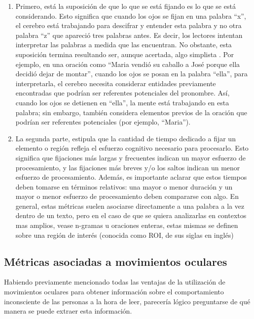 \begin{enumerate}
    \item Primero, está la suposición de que lo que se está fijando es lo que se está considerando. Esto significa que cuando los ojos se fijan en una palabra “x”, el cerebro está trabajando para descifrar y entender esta palabra y no otra palabra “z” que apareció tres palabras antes. Es decir, los lectores intentan interpretar las palabras a medida que las encuentran. No obstante, esta suposición termina resultando ser, aunque acertada, algo simplista \parencite{EhrlichRayner1983}. Por ejemplo, en una oración como “Maria vendió su caballo a José porque ella decidió dejar de montar”, cuando los ojos se posan en la palabra “ella”, para interpretarla, el cerebro necesita considerar entidades previamente encontradas que podrían ser referentes potenciales del pronombre. Así, cuando los ojos se detienen en “ella”, la mente está trabajando en esta palabra; sin embargo, también considera elementos previos de la oración que podrían ser referentes potenciales (por ejemplo, “Maria”).
    \item La segunda parte, estipula que la cantidad de tiempo dedicado a fijar un elemento o región refleja el esfuerzo cognitivo necesario para procesarlo. Esto significa que fijaciones más largas y frecuentes indican un mayor esfuerzo de procesamiento, y las fijaciones más breves y/o los saltos indican un menor esfuerzo de procesamiento. Además, es importante aclarar que estos tiempos deben tomarse en términos relativos: una mayor o menor duración y un mayor o menor esfuerzo de procesamiento deben compararse con algo. En general, estas métricas suelen asociarse directamente a una palabra a la vez dentro de un texto, pero en el caso de que se quiera analizarlas en contextos mas amplios, vease n-gramas u oraciones enteras, estas mismas se definen sobre una región de interés (conocida como ROI, de sus siglas en inglés)
\end{enumerate}

\subsection{Métricas asociadas a movimientos oculares}

\label{subsec:metricas_movimientos}

Habiendo previamente mencionado todas las ventajas de la utilización de movimientos oculares para obtener información sobre el comportamiento inconsciente de las personas a la hora de leer, parecería lógico preguntarse de qué manera se puede extraer esta información.

